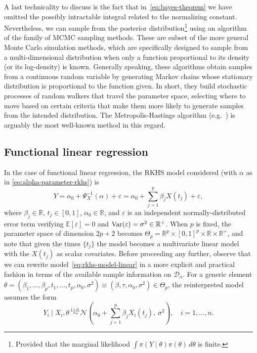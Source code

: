 \documentclass[ba]{imsart}
\numberwithin{equation}{section}
\theoremstyle{plain}
\renewcommand{\epsilon}{\varepsilon}
\newcommand{\R}{\mathbb{R}}
\newcommand{\E}{\mathbb{E}}
\newcommand{\Var}{\ensuremath\operatorname{Var}}
\begin{document}
A last technicality to discuss is the fact that in~\eqref{eq:bayes-theorem} we have omitted the possibly intractable integral related to the normalizing constant. Nevertheless, we can sample from the posterior distribution\footnote{Provided that the marginal likelihood \(\int \pi(Y\mid \theta)\pi(\theta)\, d\theta\) is finite.} using an algorithm of the family of MCMC sampling methods. These are subset of the more general Monte Carlo simulation methods, which are specifically designed to sample from a multi-dimensional distribution when only a function proportional to its density (or its log-density) is known. Generally speaking, these algorithms obtain samples from a continuous random variable by generating Markov chains whose stationary distribution is proportional to the function given. In short, they build stochastic processes of random walkers that travel the parameter space, selecting where to move based on certain criteria that make them more likely to generate samples from the intended distribution. The Metropolis-Hastings algorithm (e.g.~\cite{chib1995understanding}) is arguably the most well-known method in this regard.

\subsection{Functional linear regression}\label{sec:rkhs-linear-model}

In the case of functional linear regression, the RKHS model considered (with \(\alpha\) as in \eqref{eq:alpha-parameter-rkhs}) is
\begin{equation}\label{eq:rkhs-model-linear}
  Y = \alpha_0 + \Psi^{-1}_X(\alpha) + \epsilon = \alpha_0 + \sum_{j=1}^p \beta_j X(t_j) + \epsilon,
\end{equation}
where \(\beta_j \in \R\), \(t_j \in [0, 1]\), \(\alpha_0\in\R\), and \(\epsilon\) is an independent normally-distributed error term verifying \(\E[\epsilon]=0\) and \(\Var(\epsilon)=\sigma^2\in \R^+\). When \(p\) is fixed, the parameter space of dimension \(2p + 2\) becomes \(\Theta_p = \R^p \times [0, 1]^p \times \R \times \R^+\), and note that given the times \(\{t_j\}\) the model becomes a multivariate linear model with the \(X(t_j)\) as scalar covariates. Before proceeding any further, observe that we can rewrite model~\eqref{eq:rkhs-model-linear} in a more explicit and practical fashion in terms of the available sample information on \(\mathcal D_n\). For a generic element \(\theta = (\beta_1,\dots, \beta_p, t_1,\dots, t_p, \alpha_0, \sigma^2) \equiv (\beta, \tau, \alpha_0, \sigma^2) \in \Theta_p\), the reinterpreted model assumes the form
\begin{equation}\label{eq:rkhs-model-linear-2}
  Y_i \mid X_i, \theta \ \stackrel{\text{i.i.d.}}{\sim} \mathcal N\left(\alpha_0 + \sum_{j=1}^p \beta_j X_i(t_j), \ \sigma^2\right), \quad i =1,\dots, n.
\end{equation}
\end{document}
